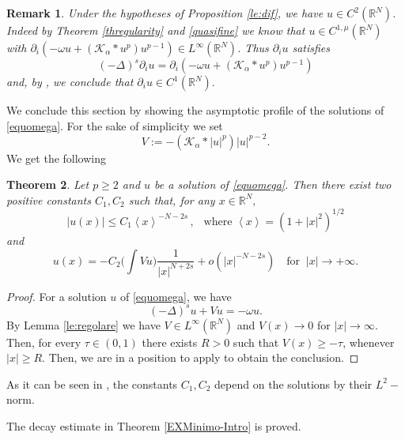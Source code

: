 \documentclass[10pt]{amsart}
\numberwithin{equation}{section}
\newtheorem{theorem}{Theorem}[section]
\newtheorem{remark}[theorem]{Remark}
\begin{document}
\begin{remark}\rm\label{Questa}
Under the hypotheses of Proposition \ref{le:dif},
we have $u\in C^{2}(\mathbb R^{N})$. Indeed by Theorem \ref{thregularity} and 
\eqref{quasifine} we know that 
$u\in C^{1,\mu}(\mathbb{R}^N)$
with $ \partial_i (-\omega u+(\mathcal{K}_\alpha * u^p)u^{p-1})\in L^{\infty}(\mathbb R^{N})$.
Thus $\partial_i u$ satisfies
\[
{{(-\Delta)^{s}}} \partial_i u = \partial_i(-\omega u +(\mathcal{K}_\alpha * u^p)u^{p-1})
\]
and, by \cite[Proposition 2.1.11]{Silvestre}, we conclude  that $\partial_{i}u\in C^{1}(\mathbb R^{N}).$
\end{remark}

\noindent We conclude this section by showing the asymptotic profile of the solutions of \eqref{equomega}.
For the sake of simplicity we set
\begin{equation*} 
V:=-(\mathcal K_{\alpha}*|u|^{p})|u|^{p-2}.
\end{equation*}
\noindent We get the following
\begin{theorem}
\label{dec-thm}
Let $p\geq2$ and $u$ be a solution of \eqref{equomega}.
 Then there exist two positive constants $C_{1},C_{2}$ such that, for any $x\in \mathbb R^{N},$
\begin{equation*} 
|u(x)|\leq C_1 \left\langle x\right\rangle^{-N-2s}\,, \ \ \text{ where } \left\langle x\right\rangle=(1+|x|^{2})^{1/2}
\end{equation*}
and 
\begin{equation*} 
u(x)=-C_{2} \Big(\int V u\Big) \frac{1}{|x|^{N+2s}}+o( |x|^{-N-2s}) \ \ \ \text{ for }\ |x|\to+\infty.
\end{equation*}
\end{theorem}
\begin{proof}
For a  solution $u$ of \eqref{equomega}, we have
$$
(-\Delta)^{s}u+V u= -\omega u.
$$
By   Lemma \ref{le:regolare} we have $V\in L^{\infty}(\mathbb R^{N})$
and $V(x)\to 0$ for $|x|\to \infty$. Then, for every $\tau\in(0,1)$ there exists $R>0$ such that $V(x)\geq -\tau$, whenever $|x|\geq R.$
Then, we are in a position to apply \cite[Lemma C.2]{FLS} to obtain the conclusion.
\end{proof}

\noindent As it can be seen in \cite[Lemma C.2]{FLS}, the constants $C_{1},C_{2}$ depend
on the solutions by their $L^{2}-$norm.

\noindent The decay estimate in Theorem \ref{EXMinimo-Intro} is proved.
\end{document}
